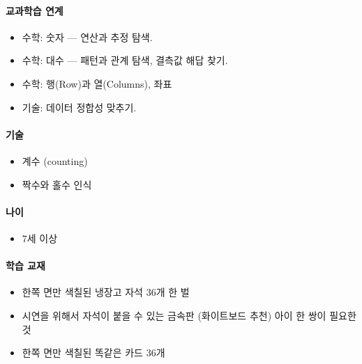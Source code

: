 \documentclass[]{article}
\begin{document}
\mbox{}\paragraph{교과학습 연계}\label{section-63}

\begin{itemize}
\itemsep1pt\parskip0pt
\item
  수학: 숫자 --- 연산과 추정 탐색.
\item
  수학: 대수 --- 패턴과 관계 탐색, 결측값 해답 찾기.
\item
  수학: 행(Row)과 열(Columns), 좌표
\item
  기술: 데이터 정합성 맞추기.
\end{itemize}

\mbox{}\paragraph{기술}\label{section-64}

\begin{itemize}
\itemsep1pt\parskip0pt
\item
  계수 (counting)
\item
  짝수와 홀수 인식
\end{itemize}

\mbox{}\paragraph{나이}\label{section-65}

\begin{itemize}
\itemsep1pt\parskip0pt
\item
  7세 이상
\end{itemize}

\mbox{}\paragraph{학습 교재}\label{section-66}

\begin{itemize}
\itemsep1pt\parskip0pt
\item
  한쪽 면만 색칠된 냉장고 자석 36개 한 벌
\item
  시연을 위해서 자석이 붙을 수 있는 금속판 (화이트보드 추천) 아이 한
  쌍이 필요한 것
\item
  한쪽 면만 색칠된 똑같은 카드 36개
\end{itemize}

\end{document}
